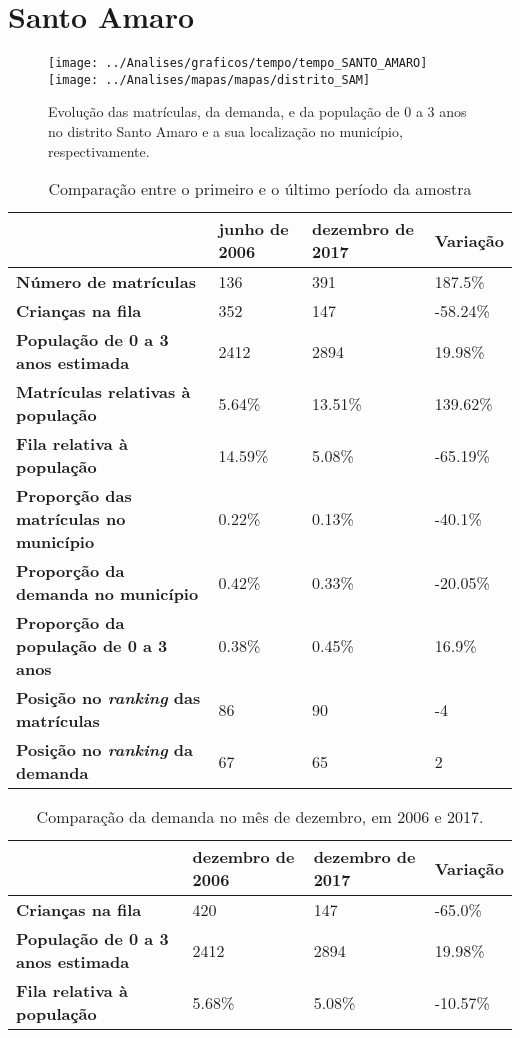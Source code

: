 \section{Santo Amaro}
\begin{figure}[H]
	\centering
	\texttt{[image: ../Analises/graficos/tempo/tempo\_SANTO\_AMARO]}
	\texttt{[image: ../Analises/mapas/mapas/distrito\_SAM]}
	\caption{Evolução das matrículas, da demanda, e da população de 0 a 3 anos no distrito Santo Amaro e a sua localização no município, respectivamente.}
\end{figure}
\begin{table}[H]
	\begin{tabular}{|l|l|l|l|}
		\hline
		\textbf{}                                      & \textbf{junho de 2006}       & \textbf{dezembro de 2017}    & \textbf{Variação} \\ \hline
		\textbf{Número de matrículas}                  & 136 & 391 & 187.5\% \\ \hline
		\textbf{Crianças na fila}                      & 352 & 147 & -58.24\% \\ \hline
		\textbf{População de 0 a 3 anos estimada}      & 2412 & 2894 & 19.98\% \\ \hline
		\textbf{Matrículas relativas à população}      & 5.64\% & 13.51\% & 139.62\% \\ \hline
		\textbf{Fila relativa à população}             & 14.59\% & 5.08\% & -65.19\% \\ \hline
		\textbf{Proporção das matrículas no município} & 0.22\% & 0.13\% & -40.1\% \\ \hline
		\textbf{Proporção da demanda no município}     & 0.42\% & 0.33\% & -20.05\% \\ \hline
		\textbf{Proporção da população de 0 a 3 anos}  & 0.38\% & 0.45\% & 16.9\% \\ \hline
		\textbf{Posição no \textit{ranking} das matrículas}     & 86 & 90 & -4 \\ \hline
		\textbf{Posição no \textit{ranking} da demanda}         & 67 & 65 & 2 \\ \hline
	\end{tabular}
	\caption{Comparação entre o primeiro e o último período da amostra}
\end{table}
\begin{table}[H]
	\begin{tabular}{|l|l|l|l|}
		\hline
		\textbf{}                                 & \textbf{dezembro de 2006} & \textbf{dezembro de 2017} & \textbf{Variação} \\ \hline
		\textbf{Crianças na fila}                      & 420 & 147 & -65.0\% \\ \hline
		\textbf{População de 0 a 3 anos estimada}      & 2412 & 2894 & 19.98\% \\ \hline
		\textbf{Fila relativa à população}             & 5.68\% & 5.08\% & -10.57\% \\ \hline
	\end{tabular}
	\caption{Comparação da demanda no mês de dezembro, em 2006 e 2017.}
\end{table}
